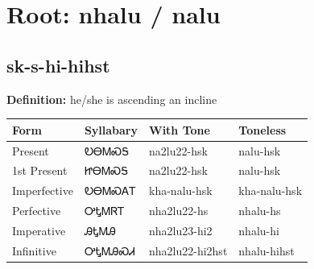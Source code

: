 \documentclass{article}%
\begin{document}
%
\normalsize%
\section*{Root: nhalu / nalu}%
\subsection*{sk-s-hi-hihst}%
\textbf{Definition: }%
he/she is ascending an incline%
\\[0.5em]%
\begin{tabular}{|l|l|l|l|}%
\hline%
\textbf{Form}&\textbf{Syllabary}&\textbf{With Tone}&\textbf{Toneless}\\%
\hline%
Present&ᎧᎾᎷᏍᎦ&na2lu22{-}hsk&nalu{-}hsk\\%
1st Present&ᏥᎾᎷᏍᎦ&na2lu22{-}hsk&nalu{-}hsk\\%
Imperfective&ᎧᎾᎷᏍᎪᎢ&kha{-}nalu{-}hsk&kha{-}nalu{-}hsk\\%
Perfective&ᎤᎿᎷᏒᎢ&nha2lu22{-}hs&nhalu{-}hs\\%
Imperative&ᎯᎿᎷᎯ&nha2lu23{-}hi2&nhalu{-}hi\\%
Infinitive&ᎤᎿᎷᎯᏍᏗ&nha2lu22{-}hi2hst&nhalu{-}hihst\\%
\hline%
\end{tabular}%
\\[1em]%
\end{document}
